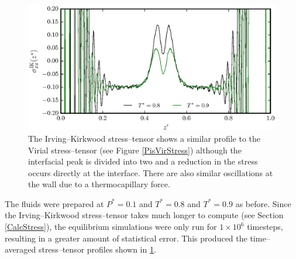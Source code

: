 \begin{figure}[h]
\centering
\includegraphics[scale=0.8]{PisIKStress}
\caption{The Irving--Kirkwood stress--tensor shows a similar profile to the Virial stress--tensor (see Figure \ref{PisVirStress}) although the interfacial peak is divided into two and a reduction in the stress occurs directly at the interface.
There are also similar oscillations at the wall due to a thermocapillary force.}
\label{PisIKStress}
\end{figure}
\FloatBarrier
The fluids were prepared at $P^{*}=0.1$ and $T^{*}=0.8$ and $T^{*}=0.9$ as before.
Since the Irving--Kirkwood stress--tensor takes much longer to compute (see Section \ref{CalcStress}), the equilibrium simulations were only run for $1 \times 10^{6}$ timesteps, resulting in a greater amount of statistical error.
This produced the time--averaged stress--tensor profiles shown in \ref{PisIKStress}.
\FloatBarrier

